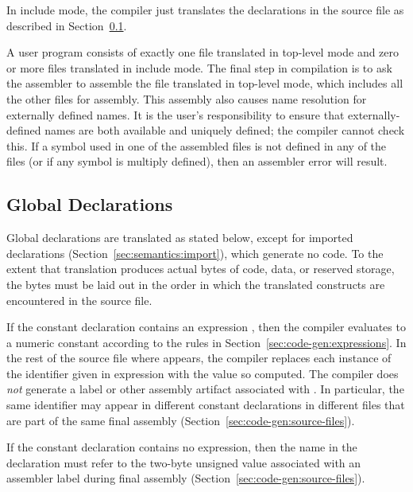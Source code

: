 \documentclass[10pt]{article}
\begin{document}
 In include mode, the compiler just translates
the declarations in the source file as described in
Section~\ref{sec:code-gen:global-decls}.

 A user program consists
of exactly one file translated in top-level mode and zero or more
files translated in include mode.  The final step in compilation is to
ask the assembler to assemble the file translated in top-level mode,
which includes all the other files for assembly.  This assembly also
causes name resolution for externally defined names.  It is the user's
responsibility to ensure that externally-defined names are both
available and uniquely defined; the compiler cannot check this.  If a
symbol used in one of the assembled files is not defined in any of the
files (or if any symbol is multiply defined), then an assembler error
will result.

\subsection{Global Declarations}
\label{sec:code-gen:global-decls}

Global declarations are translated as stated below, except for
imported declarations (Section~\ref{sec:semantics:import}), which
generate no code.  To the extent that translation produces actual
bytes of code, data, or reserved storage, the bytes must be laid out
in the order in which the translated constructs are encountered in the
source file.

 If the constant declaration
 contains an expression , then the
compiler evaluates  to a numeric constant according to
the rules in Section~\ref{sec:code-gen:expressions}.  In the rest of
the source file where  appears, the compiler
replaces each instance of the identifier given in 
expression with the value so computed.  The compiler does \emph{not}
generate a label or other assembly artifact associated with
.  In particular, the same identifier may appear
in different constant declarations in different files that are part of
the same final assembly (Section~\ref{sec:code-gen:source-files}).

If the constant declaration contains no expression, then the name in
the declaration must refer to the two-byte unsigned value associated
with an assembler label during final assembly
(Section~\ref{sec:code-gen:source-files}).
\end{document}
